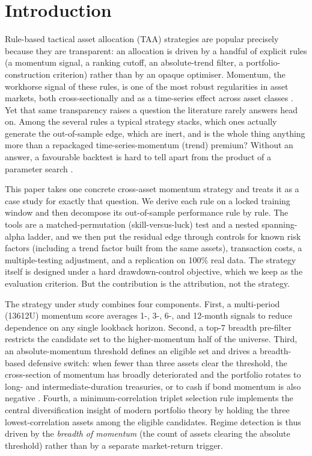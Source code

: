 \section{Introduction}
\label{sec:introduction}

Rule-based tactical asset allocation (TAA) strategies are popular precisely
because they are transparent: an allocation is driven by a handful of explicit
rules (a momentum signal, a ranking cutoff, an absolute-trend filter, a
portfolio-construction criterion) rather than by an opaque optimiser.
Momentum, the workhorse signal of these rules, is one of the most robust
regularities in asset markets, both cross-sectionally and as a time-series effect
across asset classes \citep{jegadeesh1993, moskowitz2012, asness2013}.
Yet that same transparency raises a question the literature rarely answers head on.
Among the several rules a typical strategy stacks, which ones actually generate the
out-of-sample edge, which are inert, and is the whole thing anything more than a
repackaged time-series-momentum (trend) premium? Without an answer, a favourable
backtest is hard to tell apart from the product of a parameter search
\citep{yang2019, harvey2018}.

This paper takes one concrete cross-asset momentum strategy and treats it as a case
study for exactly that question. We derive each rule on a locked training window and
then decompose its out-of-sample performance rule by rule. The tools are a
matched-permutation (skill-versus-luck) test and a nested spanning-alpha ladder, and
we then put the residual edge through controls for known risk factors (including a
trend factor built from the same assets), transaction costs, a multiple-testing
adjustment, and a replication on 100\% real data. The strategy itself is designed
under a hard drawdown-control objective, which we keep as the evaluation criterion.
But the contribution is the attribution, not the strategy.

The strategy under study combines four components.
First, a multi-period (13612U) momentum score averages 1-, 3-, 6-, and 12-month
signals to reduce dependence on any single lookback horizon.
Second, a top-$7$ breadth pre-filter restricts the candidate set to the
higher-momentum half of the universe.
Third, an absolute-momentum threshold defines an eligible set and drives a
breadth-based defensive switch: when fewer than three assets clear the threshold,
the cross-section of momentum has broadly deteriorated and the portfolio rotates
to long- and intermediate-duration treasuries, or to cash if bond momentum is also
negative \citep{keller2017, antonacci2014}.
Fourth, a minimum-correlation triplet selection rule implements the central
diversification insight of modern portfolio theory \citep{markowitz1952} by
holding the three lowest-correlation assets among the eligible candidates.
Regime detection is thus driven by the \emph{breadth of momentum} (the count of
assets clearing the absolute threshold) rather than by a separate market-return
trigger.

